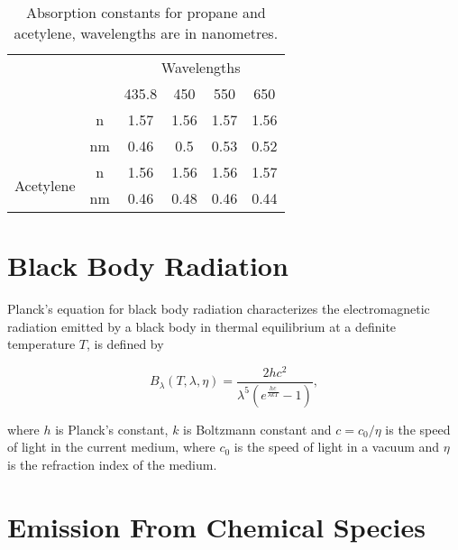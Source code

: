 \begin{table}[htbp!]
\centering
\caption{Absorption constants for propane and acetylene, wavelengths are in nanometres.}
\label{tb:soot_absorption_coefficients}
\begin{tabular}{cc|c|c|c|c|}
\cline{3-6}
                                                 &    & \multicolumn{4}{c|}{Wavelengths} \\ \cline{3-6} 
                                                 &    & 435.8   & 450    & 550   & 650   \\ \hhline{--|=|=|=|=|}
\multicolumn{1}{|c|}{\multirow{2}{*}{Propane}}   & \multicolumn{1}{c||}{n}  & 1.57    & 1.56   & 1.57  & 1.56  \\ \cline{2-6} 
\multicolumn{1}{|c|}{}                           & \multicolumn{1}{c||}{nm} & 0.46    & 0.5    & 0.53  & 0.52  \\ \hline
\multicolumn{1}{|c|}{\multirow{2}{*}{Acetylene}} & \multicolumn{1}{c||}{n}  & 1.56    & 1.56   & 1.56  & 1.57  \\ \cline{2-6} 
\multicolumn{1}{|c|}{}                           & \multicolumn{1}{c||}{nm} & 0.46    & 0.48   & 0.46  & 0.44  \\ \hline
\end{tabular}
\end{table}

\section{Black Body Radiation}
\label{sec:black_body_radiation}

Planck's equation for black body radiation characterizes the electromagnetic radiation emitted by a black body in thermal equilibrium at a definite temperature $T$, is defined by

\begin{equation}
B_\lambda(T, \lambda, \eta) = \frac{2 h c^2}{\lambda^5  (e ^\frac{h c}{\lambda k T} - 1)},
\end{equation}

where $h$ is Planck's constant, $k$ is Boltzmann constant and $c =  c_0 / \eta$ is the speed of light in the current medium, where $c_0$ is the speed of light in a vacuum and $\eta$ is the refraction index of the medium.

\section{Emission From Chemical Species}
\label{sec:emission_from_chemical_species}

